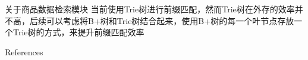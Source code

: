 \documentclass[aspectratio=169]{beamer}
\begin{document}
\begin{frame}{关于商品数据检索模块}
    当前使用Trie树进行前缀匹配，然而Trie树在外存的效率并不高，后续可以考虑将B+树和Trie树结合起来，使用B+树的每一个叶节点存放一个Trie树的方式，来提升前缀匹配效率
\end{frame}


\begin{frame}{References}
    \tiny
    
\end{frame}
\end{document}
